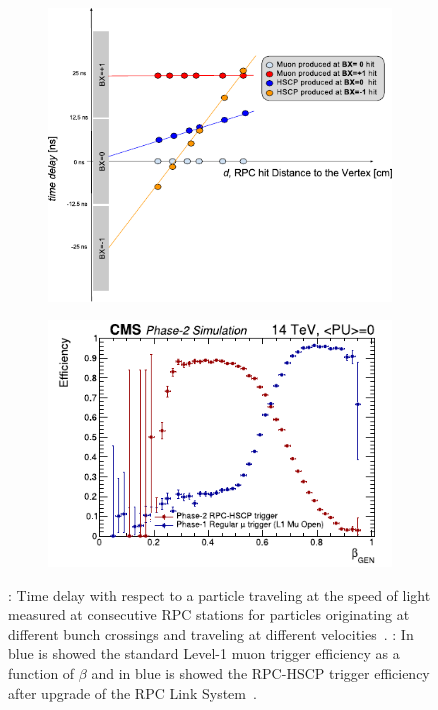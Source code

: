 	\begin{figure}[H]
		\begin{subfigure}{0.5\linewidth}
			\centering
			\includegraphics[width = \linewidth]{fig/chapt4/HSCP-RPC-trigger-time.pdf}
			\caption{\label{fig:HSCP-trigger:A}}
		\end{subfigure}
		\begin{subfigure}{0.5\linewidth}
			\centering
			\includegraphics[width = \linewidth]{fig/chapt4/HSCP-RPC-trigger-efficiency.pdf}
			\caption{\label{fig:HSCP-trigger:B}}
		\end{subfigure}
		\caption{\label{fig:HSCP-trigger} : Time delay with respect to a particle traveling at the speed of light measured at consecutive RPC stations for particles originating at different bunch crossings and traveling at different velocities~\cite{PHASEIITP}. : In blue is showed the standard Level-1 muon trigger efficiency as a function of $\beta$ and in blue is showed the RPC-HSCP trigger efficiency after upgrade of the RPC Link System~\cite{PHASEIITP}.}
	\end{figure}
	
